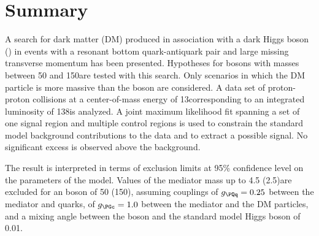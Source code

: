 \section{Summary}
A search for dark matter (DM) produced in association with a dark Higgs boson (\darkHiggs) in events with a resonant bottom quark-antiquark pair and large missing transverse momentum has been presented. Hypotheses for \darkHiggs bosons with masses between 50 and 150\GeV are tested with this search. Only scenarios in which the DM particle is more massive than the \darkHiggs boson are considered. A data set of proton-proton collisions at a center-of-mass energy of 13\TeV corresponding to an integrated luminosity of 138\fbinv is analyzed. A joint maximum likelihood fit spanning a set of one signal region and multiple control regions is used to constrain the standard model background contributions to the data and to extract a possible signal. No significant excess is observed above the background.

The result is interpreted in terms of exclusion limits at 95\% confidence level on the parameters of the model. Values of the mediator mass up to 4.5 (2.5)\TeV are excluded for an \darkHiggs boson of 50 (150)\GeV, assuming couplings of $\gq = 0.25$ between the mediator and quarks, of $\gchi = 1.0$ between the mediator and the DM particles, and a mixing angle between the \darkHiggs boson and the standard model Higgs boson of 0.01. 

